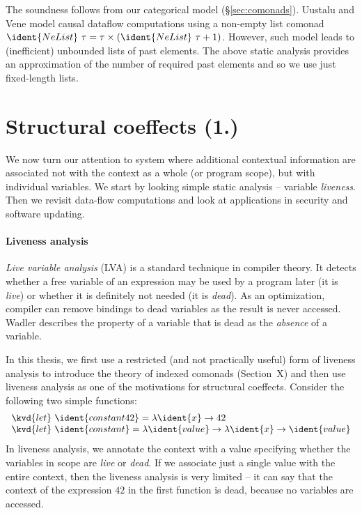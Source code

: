 The soundness follows from our categorical model (\S\ref{sec:comonads}). Uustalu and Vene
\cite{comonads-notions} model causal dataflow computations using a non-empty list comonad 
$\ident{NeList}~\tau = \tau \times (\ident{NeList}~\tau + 1)$. However, such model leads to
(inefficient) unbounded lists of past elements. The above static analysis provides an
approximation of the number of required past elements and so we use just fixed-length lists.


\section{Structural coeffects (1.)}

We now turn our attention to system where additional contextual information are associated not
with the context as a whole (or program scope), but with individual variables. We start by looking
simple static analysis -- variable \emph{liveness}. Then we revisit data-flow computations and
look at applications in security and software updating.


\paragraph{Liveness analysis}

\emph{Live variable analysis} (LVA) \cite{app-modern-compiler} is a standard technique in compiler theory. 
It detects whether a free variable of an expression may be used by a program later (it is
\emph{live}) or whether it is definitely not needed (it is \emph{dead}). As an optimization, 
compiler can remove bindings to dead variables as the result is never accessed. Wadler 
\cite{app-strictness-absecnce} describes the property of a variable that is dead as the 
\emph{absence} of a variable. 

In this thesis, we first use a restricted (and not practically useful) form of liveness analysis
to introduce the theory of indexed comonads (Section~X) and then use liveness analysis as one of the
motivations for structural coeffects. Consider the following two simple functions:
%
\begin{equation*}
\begin{array}{l}
\kvd{let}~\ident{constant42} = \lambda \ident{x} \rightarrow 42\\
\kvd{let}~\ident{constant} = \lambda \ident{value} \rightarrow \lambda \ident{x} \rightarrow \ident{value}
\end{array}
\end{equation*}
%
In liveness analysis, we annotate the context with a value specifying whether the variables in
scope are \emph{live} or \emph{dead}. If we associate just a single value with the entire 
context, then the liveness analysis is very limited -- it can say that the context of the 
expression $42$ in the first function is dead, because no variables are accessed. 


